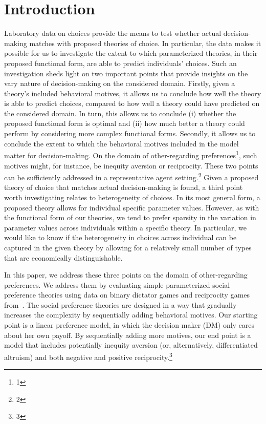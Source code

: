 \documentclass[letterpaper,11pt,leqno]{article}
\begin{document}
\section{Introduction}\label{s:introductions}

Laboratory data on choices provide the means to test whether actual decision-making matches with proposed theories of choice. In particular, the data makes it possible for us to investigate the extent to which parameterized theories, in their proposed functional form, are able to predict individuals' choices. Such an investigation sheds light on two important points that provide insights on the vary nature of decision-making on the considered domain. Firstly, given a theory's included behavioral motives, it allows us to conclude how well the theory is able to predict choices, compared to how well a theory could have predicted on the considered domain. In turn, this allows us to conclude (i) whether the proposed functional form is optimal and (ii) how much better a theory could perform by considering more complex functional forms. Secondly, it allows us to conclude the extent to which the behavioral motives included in the model matter for decision-making. On the domain of other-regarding preferences\footnote{1}, such motives might, for instance, be inequity aversion or reciprocity. These two points can be sufficiently addressed in a representative agent setting.\footnote{2} Given a proposed theory of choice that matches actual decision-making is found, a third point worth investigating relates to heterogeneity of choices. In its most general form, a proposed theory allows for individual specific parameter values. However, as with the functional form of our theories, we tend to prefer sparsity in the variation in parameter values across individuals within a specific theory. In particular, we would like to know if the heterogeneity in choices across individual can be captured in the given theory by allowing for a relatively small number of types that are economically distinguishable.

In this paper, we address these three points on the domain of other-regarding preferences. We address them by evaluating simple parameterized social preference theories using data on binary dictator games and reciprocity games from~\cite{Bruhin2019}. The social preference theories are designed in a way that gradually increases the complexity by sequentially adding behavioral motives. Our starting point is a linear preference model, in which the decision maker (DM) only cares about her own payoff. By sequentially adding more motives, our end point is a model that includes potentially inequity aversion (or, alternatively, differentiated altruism) and both negative and positive reciprocity.\footnote{3}
\end{document}
